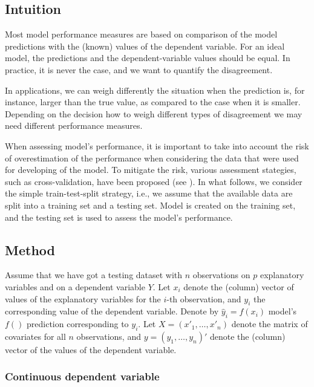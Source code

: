 \documentclass[12pt,]{krantz}
\begin{document}
\hypertarget{modelPerformanceIntuition}{%
\subsection{Intuition}\label{modelPerformanceIntuition}}

Most model performance measures are based on comparison of the model predictions with the (known) values of the dependent variable. For an ideal model, the predictions and the dependent-variable values should be equal. In practice, it is never the case, and we want to quantify the disagreement.

In applications, we can weigh differently the situation when the prediction is, for instance, larger than the true value, as compared to the case when it is smaller. Depending on the decision how to weigh different types of disagreement we may need different performance measures.

When assessing model's performance, it is important to take into account the risk of overestimation of the performance when considering the data that were used for developing of the model. To mitigate the risk, various assessment stategies, such as cross-validation, have been proposed (see \citep{AppliedPredictiveModeling2013}). In what follows, we consider the simple train-test-split strategy, i.e., we assume that the available data are split into a training set and a testing set. Model is created on the training set, and the testing set is used to assess the model's performance.

\hypertarget{modelPerformanceMethod}{%
\subsection{Method}\label{modelPerformanceMethod}}

Assume that we have got a testing dataset with \(n\) observations on \(p\) explanatory variables and on a dependent variable \(Y\). Let \(x_i\) denote the (column) vector of values of the explanatory variables for the \(i\)-th observation, and \(y_i\) the corresponding value of the dependent variable. Denote by \(\widehat{y}_i=f(x_i)\) model's \(f()\) prediction corresponding to \(y_i\). Let \(X=(x'_1,\ldots,x'_n)\) denote the matrix of covariates for all \(n\) observations, and \(y=(y_1,\ldots,y_n)'\) denote the (column) vector of the values of the dependent variable.

\hypertarget{modelPerformanceMethodCont}{%
\subsubsection{Continuous dependent variable}\label{modelPerformanceMethodCont}}
\end{document}
